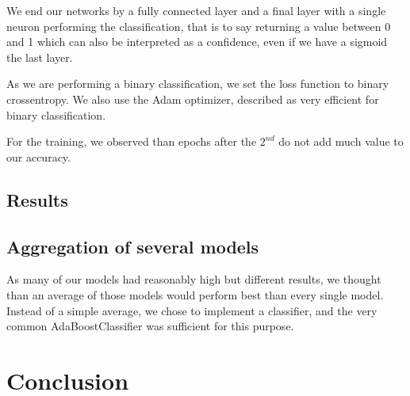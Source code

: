 \documentclass[10pt,conference,compsocconf]{IEEEtran}
\begin{document}
We end our networks by a fully connected layer and a final layer with a single neuron performing the classification, that is to say returning a value between 0 and 1 which can also be interpreted as a confidence, even if we have a sigmoid the last layer.

As we are performing a binary classification, we set the loss function to binary crossentropy. We also use the Adam optimizer, described as very efficient for binary classification.

For the training, we observed than epochs after the $2^{nd}$ do not add much value to our accuracy.

\subsection{Results}

\subsection{Aggregation of several models}

As many of our models had reasonably high but different results, we thought than an average of those models would perform best than every single model. Instead of a simple average, we chose to implement a classifier, and the very common AdaBoostClassifier was sufficient for this purpose.

\section{Conclusion}
\end{document}
